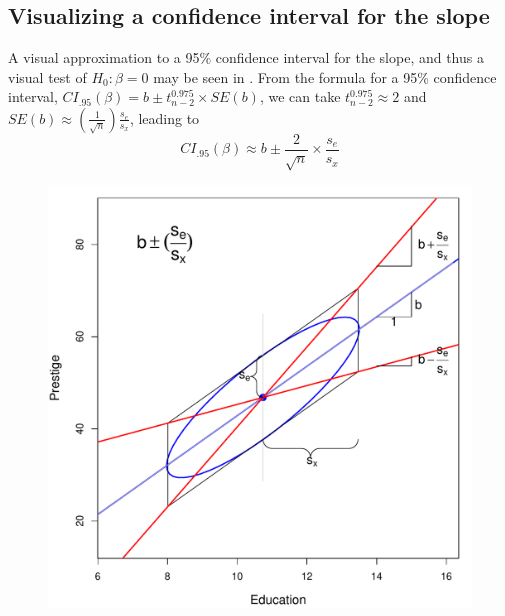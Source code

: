 \subsection{Visualizing a confidence interval for the slope}
A visual approximation to a 95\% confidence interval for the slope, and thus a visual test of $H_0 : \beta = 0$
may be seen in .  From the formula for a 95\% confidence interval,
$CI_{.95} (\beta) = b \pm t_{n-2}^{0.975} \times SE(b)$, we can take $t_{n-2}^{0.975} \approx 2$
and 
 $SE(b) \approx \left(\frac{1}{\sqrt{n}}\right) \frac{s_e}{s_x}$, 
leading to
\begin{equation}\label{eq:ci-approx}
CI_{.95} (\beta) \approx b \pm \frac{2}{\sqrt{n}} \times \frac{s_e}{s_x}
\end{equation}
\begin{figure}[htb]
  \begin{minipage}[c]{.49\textwidth}
   \includegraphics[width=1\linewidth,clip]{fig/vis-reg-prestige1}
   \end{minipage}%
  \hfill
  \begin{minipage}[c]{.49\textwidth}

\end{minipage}
\end{figure}
